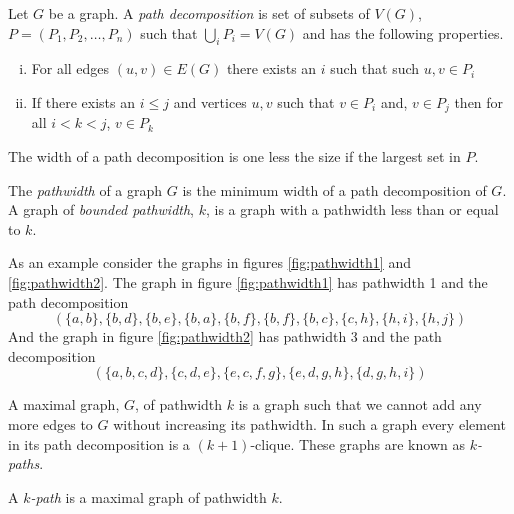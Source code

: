 \begin{definition}
    Let $G$ be a graph. A \textit{path decomposition} is set of subsets of $V(G)$, $P=(P_1,P_2,\dots,P_n)$ such that $\bigcup_{i} P_i=V(G)$ and has the following properties.    
    \begin{enumerate}[(i)]
        \item For all edges $(u,v) \in E(G)$ there exists an $i$ such that such $u,v\in P_i$
        \item If there exists an $i\leq j$ and vertices $u,v$ such that $v\in P_i$ and, $v\in P_j$ then for all $i<k<j$, $v\in P_k$
    \end{enumerate}
    The width of a path decomposition is one less the size if the largest set in $P$.
\end{definition}

\begin{definition}[Pathwidth]
    The \textit{pathwidth} of a graph $G$ is the minimum width of a path decomposition of $G$.    
    A graph of \textit{bounded pathwidth}, $k$, is a graph with a pathwidth less than or equal to $k$. 
\end{definition}

As an example consider the graphs in figures \ref{fig:pathwidth1} and \ref{fig:pathwidth2}. The graph in figure \ref{fig:pathwidth1} has pathwidth 1 and the path decomposition
\[(\{a,b\},\{b,d\},\{b,e\},\{b,a\},\{b,f\},\{b,f\},\{b,c\},\{c,h\},\{h,i\},\{h,j\})\]
And the graph in figure \ref{fig:pathwidth2} has pathwidth 3 and the path decomposition 
\[(\{a,b,c,d\},\{c,d,e\},\{e,c,f,g\},\{e,d,g,h\},\{d,g,h,i\})\] 

A maximal graph, $G$, of pathwidth $k$ is a graph such that we cannot add any more edges to $G$ without increasing its pathwidth. In such a graph every element in its path decomposition is a $(k+1)$-clique. These graphs are known as \textit{$k$-paths}.
\begin{definition}[$k$-path]
    A \textit{$k$-path} is a maximal graph of pathwidth $k$.
\end{definition}

